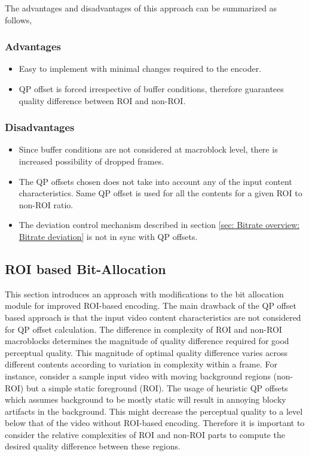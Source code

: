 \documentclass[11pt]{article} %
\begin{document}
The advantages and disadvantages of this approach can be summarized as follows,
\subsubsection*{Advantages}
\begin{itemize}
	\item Easy to implement with minimal changes required to the encoder.
	\item QP offset is forced irrespective of buffer conditions, therefore guarantees quality difference between ROI and non-ROI.
\end{itemize}

\subsubsection*{Disadvantages}
\begin{itemize}
	\item Since buffer conditions are not considered at macroblock level, there is increased possibility of dropped frames.
	\item The QP offsets chosen does not take into account any of the input content characteristics. Same QP offset is used for all the contents for a given ROI to non-ROI ratio.
	\item The deviation control mechanism described in section \ref{sec: Bitrate overview: Bitrate deviation} is not in sync with QP offsets. 
\end{itemize}


\subsection{ROI based Bit-Allocation}
This section introduces an approach with modifications to the bit allocation module for improved ROI-based encoding. The main drawback of the QP offset based approach is that the input video content characteristics are not considered for QP offset calculation. The difference in complexity of ROI and non-ROI macroblocks determines the magnitude of quality difference required for good perceptual quality. This magnitude of optimal quality difference varies across different contents according to variation in complexity within a frame. For instance, consider a sample input video with moving background regions (non-ROI) but a simple static foreground (ROI). The usage of heuristic QP offsets which assumes background to be mostly static will result in annoying blocky artifacts in the background. This might decrease the perceptual quality to a level below that of the video without ROI-based encoding. Therefore it is important to consider the relative complexities of ROI and non-ROI parts to compute the desired quality difference between these regions.
\end{document}
